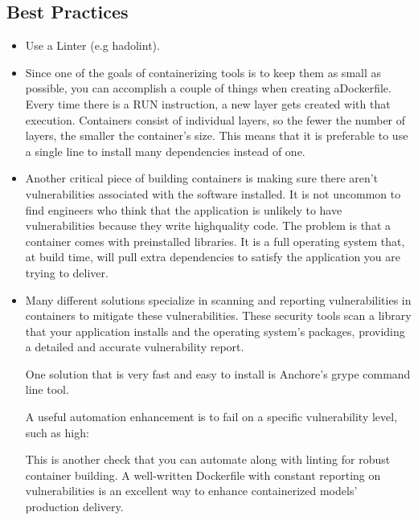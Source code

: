 \subsection*{Best Practices}
\begin{itemize}
    \item Use a Linter  (e.g hadolint).
    
    \item Since one of the goals of containerizing tools
    is to keep them as small as possible, you can
    accomplish a couple of things when creating aDockerfile.
    Every time there is a RUN instruction, a new layer gets
    created with that execution. Containers consist of
    individual layers, so the fewer the number of layers,
    the smaller the container's size. This means that it is
    preferable to use a single line to install many
    dependencies instead of one.

    \item Another critical piece of building containers is
    making sure there aren't vulnerabilities associated
    with the software installed. It is not uncommon to find
    engineers who think that the application is unlikely
    to have vulnerabilities because they write highquality
    code. The problem is that a container comes with
    preinstalled libraries. It is a full operating system
    that, at build time, will pull extra dependencies to
    satisfy the application you are trying to deliver.

    \item Many different solutions specialize in scanning and
    reporting vulnerabilities in containers to mitigate these
    vulnerabilities. These security tools scan a library that
    your application installs and the operating system's
    packages, providing a detailed and accurate vulnerability
    report.

    One solution that is very fast and easy to install is
    Anchore's grype command line tool.

    A useful automation enhancement is to fail on a specific
    vulnerability level, such as high:

    This is another check that you can automate along with
    linting for robust container building. A well-written
    Dockerfile with constant reporting on vulnerabilities is
    an excellent way to enhance containerized models'
    production delivery.
\end{itemize}






